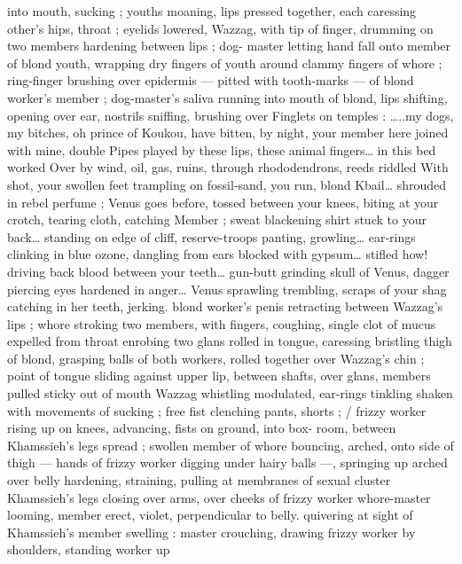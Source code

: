 into mouth, sucking ; youths moaning, lips pressed together, each 
caressing other's hips, throat ; eyelids lowered, Wazzag, with tip of 
finger, drumming on two members hardening between lips ; dog- 
master letting hand fall onto member of blond youth, wrapping dry 
fingers of youth around clammy fingers of whore ; ring-finger 
brushing over epidermis --- pitted with tooth-marks --- of blond 
worker's member ; dog-master's saliva running into mouth of blond, 
lips shifting, opening over ear, nostrils sniffing, brushing over 
Finglets on temples : {\gl}{\ldots}..my dogs, my bitches, oh prince of Koukou, 
have bitten, by night, your member here joined with mine, double 
Pipes played by these lips, these animal fingers{\ldots} in this bed worked 
Over by wind, oil, gas, ruins, through rhododendrons, reeds riddled 
With shot, your swollen feet trampling on fossil-sand, you run, blond 
Kbail{\ldots} shrouded in rebel perfume ; Venus goes before, tossed 
between your knees, biting at your crotch, tearing cloth, catching 
Member ; sweat blackening shirt stuck to your back{\ldots} standing on 
edge of cliff, reserve-troops panting, growling{\ldots} ear-rings clinking in 
blue ozone, dangling from ears blocked with gypsum{\ldots} stifled how! 
driving back blood between your teeth{\ldots} gun-butt grinding skull of 
Venus, dagger piercing eyes hardened in anger{\ldots} Venus sprawling 
trembling, scraps of your shag catching in her teeth, jerking.{\gr} 
blond worker's penis retracting between Wazzag's lips ; whore 
stroking two members, with fingers, coughing, single clot of mucus 
expelled from throat enrobing two glans rolled in tongue, caressing 
bristling thigh of blond, grasping balls of both workers, rolled 
together over Wazzag's chin ; point of tongue sliding against upper 
lip, between shafts, over glans, members pulled sticky out of mouth 
Wazzag whistling modulated, ear-rings tinkling shaken with 
movements of sucking ; free fist clenching pants, shorts ; {\slash} frizzy 
worker rising up on knees, advancing, fists on ground, into box- 
room, between Khamssieh's legs spread ; swollen member of whore 
bouncing, arched, onto side of thigh --- hands of frizzy worker 
digging under hairy balls ---, springing up arched over belly 
hardening, straining, pulling at membranes of sexual cluster 
Khamssieh's legs closing over arms, over cheeks of frizzy worker 
whore-master looming, member erect, violet, perpendicular to belly. 
quivering at sight of Khamssieh's member swelling : master 
crouching, drawing frizzy worker by shoulders, standing worker up 
